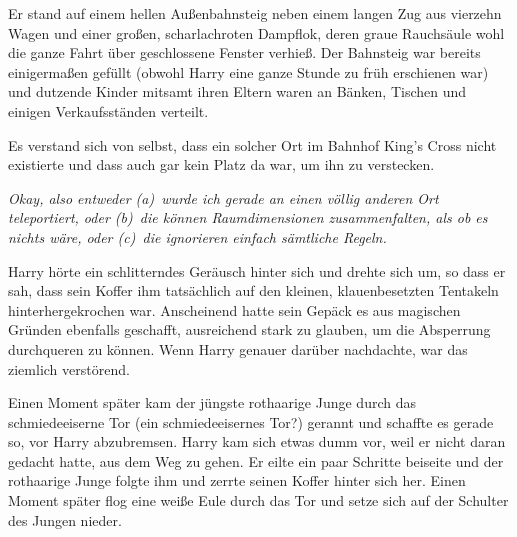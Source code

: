 Er stand auf einem hellen Außenbahnsteig neben einem langen Zug aus vierzehn Wagen und einer großen, scharlachroten Dampflok, deren graue Rauchsäule wohl die ganze Fahrt über geschlossene Fenster verhieß. Der Bahnsteig war bereits einigermaßen gefüllt (obwohl Harry eine ganze Stunde zu früh erschienen war) und dutzende Kinder mitsamt ihren Eltern waren an Bänken, Tischen und einigen Verkaufsständen verteilt.

Es verstand sich von selbst, dass ein solcher Ort im Bahnhof King’s Cross nicht existierte und dass auch gar kein Platz da war, um ihn zu verstecken.

\emph{Okay, also entweder (a)~wurde ich gerade an einen völlig anderen Ort teleportiert, oder (b)~die können Raumdimensionen zusammenfalten, als ob es nichts wäre, oder (c)~die ignorieren einfach sämtliche Regeln.}

Harry hörte ein schlitterndes Geräusch hinter sich und drehte sich um, so dass er sah, dass sein Koffer ihm tatsächlich auf den kleinen, klauenbesetzten Tentakeln hinterhergekrochen war. Anscheinend hatte sein Gepäck es aus magischen Gründen ebenfalls geschafft, ausreichend stark zu glauben, um die Absperrung durchqueren zu können. Wenn Harry genauer darüber nachdachte, war das ziemlich verstörend.

Einen Moment später kam der jüngste rothaarige Junge durch das schmiedeeiserne Tor (ein schmiedeeisernes Tor?) gerannt und schaffte es gerade so, vor Harry abzubremsen. Harry kam sich etwas dumm vor, weil er nicht daran gedacht hatte, aus dem Weg zu gehen. Er eilte ein paar Schritte beiseite und der rothaarige Junge folgte ihm und zerrte seinen Koffer hinter sich her. Einen Moment später flog eine weiße Eule durch das Tor und setze sich auf der Schulter des Jungen nieder.

